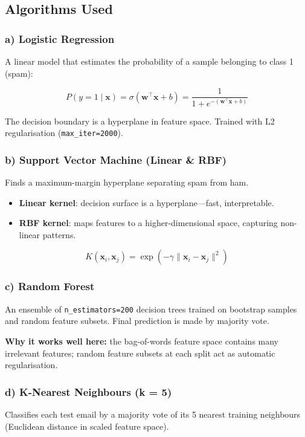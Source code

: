 \documentclass[12pt, a4paper]{article}
\begin{document}
\subsection{Algorithms Used}

\subsubsection*{a) Logistic Regression}
A linear model that estimates the probability of a sample belonging to class 1 (spam):

\begin{equation}
P(y=1 \mid \mathbf{x}) = \sigma(\mathbf{w}^\top \mathbf{x} + b) = \frac{1}{1 + e^{-(\mathbf{w}^\top \mathbf{x} + b)}}
\end{equation}

The decision boundary is a hyperplane in feature space. Trained with L2 regularisation (\texttt{max\_iter=2000}).

\subsubsection*{b) Support Vector Machine (Linear \& RBF)}
Finds a maximum-margin hyperplane separating spam from ham.
\begin{itemize}
    \item \textbf{Linear kernel}: decision surface is a hyperplane---fast, interpretable.
    \item \textbf{RBF kernel}: maps features to a higher-dimensional space, capturing non-linear patterns.
\end{itemize}

\begin{equation}
K(\mathbf{x}_i, \mathbf{x}_j) = \exp\!\left(-\gamma \|\mathbf{x}_i - \mathbf{x}_j\|^2\right)
\end{equation}

\subsubsection*{c) Random Forest}
An ensemble of \texttt{n\_estimators=200} decision trees trained on bootstrap samples and random feature subsets. Final prediction is made by majority vote.

\textbf{Why it works well here:} the bag-of-words feature space contains many irrelevant features; random feature subsets at each split act as automatic regularisation.

\subsubsection*{d) K-Nearest Neighbours (k = 5)}
Classifies each test email by a majority vote of its 5 nearest training neighbours (Euclidean distance in scaled feature space).
\end{document}
